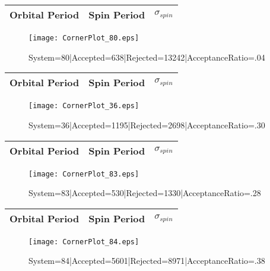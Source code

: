 \documentclass[10pt]{article}
\begin{document}
\begin{center}
        \begin{tabular}{|c|c|c|}
        \hline
Orbital Period & Spin Period & $\sigma_{spin}$ \\
 \hline
        \end{tabular}
        \end{center}
\begin{figure}[h] 
        \texttt{[image: CornerPlot\_80.eps]}
        \caption{System=80|Accepted=638|Rejected=13242|AcceptanceRatio=.04}
        \label{S80}
        \centering
        \end{figure}
\begin{center}
        \begin{tabular}{|c|c|c|}
        \hline
Orbital Period & Spin Period & $\sigma_{spin}$ \\
 \hline
        \end{tabular}
        \end{center}
\begin{figure}[h] 
        \texttt{[image: CornerPlot\_36.eps]}
        \caption{System=36|Accepted=1195|Rejected=2698|AcceptanceRatio=.30}
        \label{S36}
        \centering
        \end{figure}
\begin{center}
        \begin{tabular}{|c|c|c|}
        \hline
Orbital Period & Spin Period & $\sigma_{spin}$ \\
 \hline
        \end{tabular}
        \end{center}
\begin{figure}[h] 
        \texttt{[image: CornerPlot\_83.eps]}
        \caption{System=83|Accepted=530|Rejected=1330|AcceptanceRatio=.28}
        \label{S83}
        \centering
        \end{figure}
\begin{center}
        \begin{tabular}{|c|c|c|}
        \hline
Orbital Period & Spin Period & $\sigma_{spin}$ \\
 \hline
        \end{tabular}
        \end{center}
\begin{figure}[h] 
        \texttt{[image: CornerPlot\_84.eps]}
        \caption{System=84|Accepted=5601|Rejected=8971|AcceptanceRatio=.38}
        \label{S84}
        \centering
        \end{figure}
\end{document}
